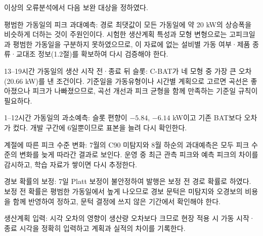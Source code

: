 이상의 오류분석에서 다음 보완 대상을 정하였다.
\begin{hwplist}
\item 평범한 가동일의 피크 과대예측: 경로 최댓값이 모든 가동일에 약 20 kW의 상승폭을 비슷하게 더하는 것이 주원인이다. 시험한 생산계획 특성과 모형 변형으로는 고피크일과 평범한 가동일을 구분하지 못하였으므로, 이 자료에 없는 설비별 가동 여부·제품 종류·교대조 정보(1.2절)를 확보하여 다시 검증해야 한다.
\item 13--19시간 가동일의 생산 시작 전·종료 뒤 슬롯: C-BAT가 네 모형 중 가장 큰 오차(20.66 kW)를 낸 조건이다. 기준일을 가동유형이나 시간별 계획으로 고르면 곡선은 좋아졌으나 피크가 나빠졌으므로, 곡선 개선과 피크 균형을 함께 만족하는 기준일 규칙이 필요하다.
\item 1--12시간 가동일의 과소예측: 슬롯 편향이 $-5.84$, $-6.14$ kW이고 기존 BAT보다 오차가 컸다. 개발 구간에 6일뿐이므로 표본을 늘려 다시 확인한다.
\item 계절에 따른 피크 수준 변화: 7월의 C90 미탐지와 8월 하순의 과대예측은 모두 피크 수준의 변화를 늦게 따라간 결과로 보인다. 운영 중 최근 관측 피크와 예측 피크의 차이를 감시하고, 학습 자료가 쌓이면 다시 추정한다.
\item 경보 확률의 보정: 7일 Platt 보정이 불안정하여 발행은 보정 전 경로 확률로 하였다. 보정 전 확률은 평범한 가동일에서 높게 나오므로 경보 문턱은 미탐지와 오경보의 비용을 함께 반영하여 정하고, 문턱 결정에 쓰지 않은 기간에서 확인해야 한다.
\item 생산계획 입력: 시각 오차의 영향이 생산량 오차보다 크므로 현장 적용 시 가동 시작·종료 시각을 정확히 입력하고 계획과 실적의 차이를 기록한다.
\end{hwplist}
